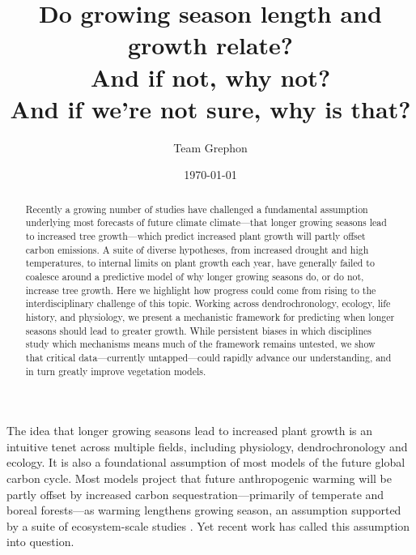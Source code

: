 \documentclass[11pt]{article}
\begin{document}
\renewcommand{\refname}{\CHead{}}


\title{Do growing season length and growth relate? \\ And if not, why not? \\ And if we're not sure, why is that?}
\author{Team Grephon}
\date{\today}
\maketitle

\begin{abstract}
Recently a growing number of studies have challenged a fundamental assumption underlying most forecasts of future climate climate---that longer growing seasons lead to increased tree growth---which predict increased plant growth will partly offset carbon emissions. A suite of diverse hypotheses, from increased drought and high temperatures, to internal limits on plant growth each year, have generally failed to coalesce around a predictive model of why longer growing seasons do, or do not, increase tree growth. Here we highlight how progress could come from rising to the interdisciplinary challenge of this topic. Working across dendrochronology, ecology, life history, and physiology, we present a mechanistic framework for predicting when longer seasons should lead to greater growth. While persistent biases in which disciplines study which mechanisms means much of the framework remains untested, we show that critical data---currently untapped---could rapidly advance our understanding, and in turn greatly improve vegetation models. %
\end{abstract}


The idea that longer growing seasons lead to increased plant growth is an intuitive tenet across multiple fields, including physiology, dendrochronology and ecology. It is also a foundational assumption of most models of the future global carbon cycle. Most models project that future anthropogenic warming will be partly offset by increased carbon sequestration---primarily of temperate and boreal forests---as warming lengthens growing season, an assumption supported by a suite of ecosystem-scale studies \citep{finzi2020,keenan2014net}. Yet recent work has called this assumption into question.
\end{document}
